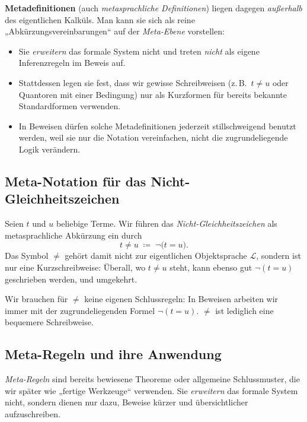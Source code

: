 \documentclass[main.tex]{subfiles}
\begin{document}
\medskip

\textbf{Metadefinitionen} (auch \emph{metasprachliche Definitionen})
liegen dagegen \emph{außerhalb} des eigentlichen Kalküls. Man kann sie
sich als reine „Abkürzungsvereinbarungen“ auf der \emph{Meta-Ebene}
vorstellen:

\begin{itemize}
  \item Sie \emph{erweitern} das formale System nicht und treten
        \emph{nicht} als eigene Inferenzregeln im Beweis auf.
  \item Stattdessen legen sie fest, dass wir gewisse Schreibweisen
        (z.\,B.\ \(t \neq u\) oder Quantoren mit einer Bedingung)
        nur als Kurzformen für bereits bekannte Standardformen
        verwenden.
  \item In Beweisen dürfen solche Metadefinitionen jederzeit stillschweigend
        benutzt werden, weil sie nur die Notation vereinfachen, nicht die
        zugrundeliegende Logik verändern.
\end{itemize}

\subsection{Meta-Notation für das Nicht-Gleichheitszeichen}

\begin{definition}
\label{def:neq-meta}
Seien \(t\) und \(u\) beliebige Terme. Wir führen das
\emph{Nicht-Gleichheitszeichen} als metasprachliche Abkürzung ein durch
\[
  t \neq u \;\coloneqq\; \neg\bigl(t = u\bigr).
\]
Das Symbol \(\neq\) gehört damit nicht zur eigentlichen Objektsprache
\(\mathcal L\), sondern ist nur eine Kurzschreibweise:
Überall, wo \(t \neq u\) steht, kann ebenso gut \(\neg(t = u)\)
geschrieben werden, und umgekehrt.
\end{definition}

\begin{remark}
Wir brauchen für \(\neq\) keine eigenen Schlussregeln: In Beweisen
arbeiten wir immer mit der zugrundeliegenden Formel \(\neg(t = u)\).
\(\neq\) ist lediglich eine bequemere Schreibweise.
\end{remark}


\subsection{Meta-Regeln und ihre Anwendung}

\emph{Meta-Regeln} sind bereits bewiesene Theoreme oder allgemeine
Schlussmuster, die wir später wie „fertige Werkzeuge“ verwenden.
Sie \emph{erweitern} das formale System nicht, sondern dienen nur
dazu, Beweise kürzer und übersichtlicher aufzuschreiben.
\end{document}
